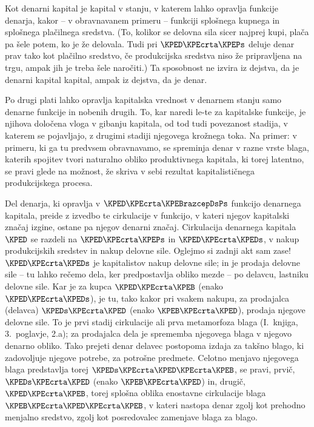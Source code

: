 \documentclass[kapital_02.tex]{subfiles}
\begin{document}
Kot denarni kapital je kapital v stanju, v katerem lahko opravlja funkcije denarja, kakor -- v obravnavanem primeru -- funkciji splošnega kupnega in splošnega plačilnega sredstva. (To, kolikor se delovna sila sicer najprej kupi, plača pa šele potem, ko je že delovala. Tudi pri \(\KPED\KPEcrta\KPEPs\) deluje denar prav tako kot plačilno sredstvo, če produkcijska sredstva niso že pripravljena na trgu, ampak jih je treba šele naročiti.) Ta sposobnost ne izvira iz dejstva, da je denarni kapital kapital, ampak iz dejstva, da je denar.

Po drugi plati lahko opravlja kapitalska vrednost v denarnem stanju samo denarne funkcije in nobenih drugih. To, kar naredi le-te za kapitalske funkcije, je njihova določena vloga v gibanju kapitala, od tod tudi povezanost stadija, v katerem se pojavljajo, z drugimi stadiji njegovega krožnega toka. Na primer: v primeru, ki ga tu predvsem obravnavamo, se spreminja denar v razne vrste blaga, katerih spojitev tvori naturalno obliko produktivnega kapitala, ki torej latentno, se pravi glede na možnost, že skriva v sebi rezultat kapitalističnega produkcijskega procesa.

Del denarja, ki opravlja v \(\KPED\KPEcrta\KPEBrazcepDsPs\) funkcijo denarnega kapitala, preide z izvedbo te cirkulacije v funkcijo, v kateri njegov kapitalski značaj izgine, ostane pa njegov denarni značaj. Cirkulacija denarnega kapitala \(\KPED\) se razdeli na \(\KPED\KPEcrta\KPEPs\) in \(\KPED\KPEcrta\KPEDs\), v nakup produkcijskih sredstev in nakup delovne sile. Oglejmo si zadnji akt sam zase! \(\KPED\KPEcrta\KPEDs\) je kapitalistov nakup delovne sile; in je prodaja delovne sile -- tu lahko rečemo dela, ker predpostavlja obliko mezde -- po delavcu, lastniku delovne sile. Kar je za kupca \(\KPED\KPEcrta\KPEB\) (enako \(\KPED\KPEcrta\KPEDs\)), je tu, tako kakor pri vsakem nakupu, za prodajalca (delavca) \(\KPEDs\KPEcrta\KPED\) (enako \(\KPEB\KPEcrta\KPED\)), prodaja njegove \KPEstran delovne sile. To je prvi stadij cirkulacije ali prva metamorfoza blaga (I.\ knjiga, 3.\ poglavje, 2.a); za prodajalca dela je sprememba njegovega blaga v njegovo denarno obliko. Tako prejeti denar delavec postopoma izdaja za takšno blago, ki zadovoljuje njegove potrebe, za potrošne predmete. Celotno menjavo njegovega blaga predstavlja torej \(\KPEDs\KPEcrta\KPED\KPEcrta\KPEB\), se pravi, prvič, \(\KPEDs\KPEcrta\KPED\) (enako \(\KPEB\KPEcrta\KPED\)) in, drugič, \(\KPED\KPEcrta\KPEB\), torej splošna oblika enostavne cirkulacije blaga \(\KPEB\KPEcrta\KPED\KPEcrta\KPEB\), v kateri nastopa denar zgolj kot prehodno menjalno sredstvo, zgolj kot posredovalec zamenjave blaga za blago.
\end{document}
